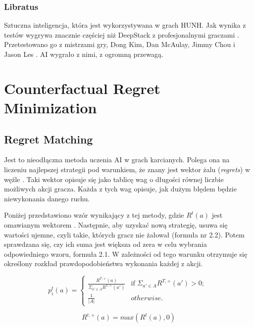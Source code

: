 \documentclass[12pt,oneside,a4paper]{report}
\begin{document}
\subsubsection{Libratus}

Sztuczna inteligencja, która jest wykorzystywana w grach HUNH. Jak wynika z
testów wygrywa znacznie częściej niż DeepStack z profesjonalnymi graczami \cite{libratus}.
Przetestowano go z mistrzami gry, Dong Kim, Dan McAulay, Jimmy Chou 
i Jason Les \cite{libratus}. AI wygrało z nimi, z ogromną przewagą.


\section{Counterfactual Regret Minimization}

\subsection{Regret Matching}

Jest to nieodłączna metoda uczenia AI w grach karcianych. Polega ona na liczeniu najlepszej 
strategii pod warunkiem, że znany jest wektor żalu (\emph{regrets}) w węźle \cite{CFR}.
Taki wektor opisuje się jako tablicę wag o długości równej liczbie możliwych akcji gracza. Każda z 
tych wag opisuje, jak dużym błędem będzie niewykonania danego ruchu.


Poniżej przedstawiono wzór wynikający z tej metody, gdzie  
$R^{t}(a)$ jest omawianym wektorem \cite{CFR}. 
Następnie, aby uzyskać nową strategię, usuwa się wartości ujemne, czyli takie, których gracz nie
żałował (formuła nr 2.2).
Potem sprawdzana się, czy ich suma jest większa od zera w celu wybrania odpowiedniego wzoru, formuła
2.1.
W zależności od tego warunku otrzymuje się określony rozkład prawdopodobieństwa wykonania każdej z
akcji.


\begin{equation}
p^{t}_{i}\left( a \right) = \left\{ \begin{array}{ll}
      \frac{R^{T, \text{+}}\left(a\right)}{ \Sigma_{a' \in A} R^{T,\text{+}}\left(a'\right)} &
      \mbox{if $\Sigma_{a' \in A} R^{T,\text{+}}\left(a'\right) >
      0$};\\
      \frac{1}{|A|} & \mbox{$otherwise$}.\end{array} \right. \ 
\end{equation}

\vspace{1cm}
\begin{equation}
   R^{t,\text{+}}(a) = max(R^t(a),0)
\end{equation}
\end{document}
